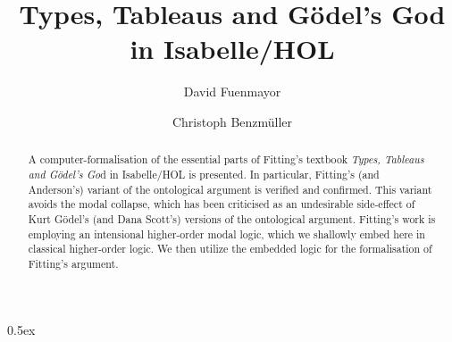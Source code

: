\documentclass[11pt,a4paper]{article}
\begin{document}
\title{Types, Tableaus and G\"odel's God \\ in Isabelle/HOL}
\author[1]{David Fuenmayor}
\author[1,2]{Christoph Benzm\"uller}

\maketitle

\begin{abstract}
	A computer-formalisation of the essential parts of Fitting's textbook
	\emph{Types, Tableaus and G\"odel's Go}d in Isabelle/HOL is
	presented. In particular, Fitting's (and Anderson's) variant of the ontological
	argument is verified and confirmed. This variant avoids the modal
	collapse, which has been criticised as an undesirable side-effect of Kurt G\"odel's (and
	Dana Scott's) versions of the ontological argument. Fitting's work
	is employing an intensional higher-order modal logic, which we
	shallowly embed here in classical higher-order logic. We then
	utilize the embedded logic for the formalisation of Fitting's argument.
\end{abstract}

\tableofcontents

\parindent 0pt\parskip 0.5ex


\pagebreak 




\end{document}
